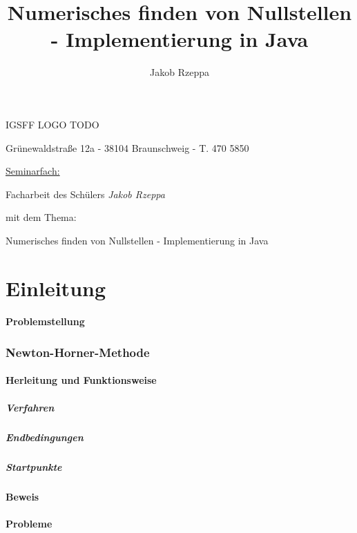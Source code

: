 \documentclass[12pt]{article}
\title{Numerisches finden von Nullstellen - Implementierung in Java}
\author{Jakob Rzeppa}
\begin{document}
\begin{titlepage}
	\centering
    {\huge IGSFF LOGO TODO\par}
	{Grünewaldstraße 12a - 38104 Braunschweig - T. 470 5850\par}
	\vspace{1cm}
	{\underline{Seminarfach:}\par}
	\vspace{1cm}
    {\large Facharbeit des Schülers \textit{Jakob Rzeppa} \par mit dem Thema: \par}
    \vspace{1.5cm}
	{\huge Numerisches finden von Nullstellen - Implementierung in Java\par}
	\vspace{2cm}
\end{titlepage}

\tableofcontents

\part{Einleitung}
    \subsection{Problemstellung}

\section{Newton-Horner-Methode}
    \subsection{Herleitung und Funktionsweise}
    \subsubsection{Verfahren}
    \subsubsection{Endbedingungen}
    \subsubsection{Startpunkte}
    \subsection{Beweis}
    \subsection{Probleme}
\end{document}
